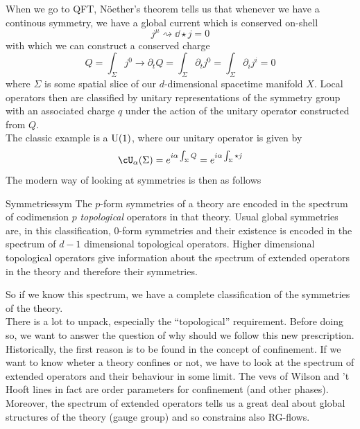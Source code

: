 When we go to QFT, Nöether's theorem tells us that whenever we have a continous symmetry, we have a global current which is conserved on-shell
\begin{equation}
	j^{\mu}\rightsquigarrow\dd\star j=0
\end{equation}
with which we can construct a conserved charge
\begin{equation}
	Q=\int_{\Sigma}j^{0}\rightarrow \partial_{t}Q=\int_{\Sigma}\partial_{t}j^{0}=\int_{\Sigma}\partial_{i}j^{i}=0
\end{equation}
where $\Sigma$ is some spatial slice of our $d$-dimensional spacetime manifold $X$. Local operators then are classified by unitary representations of the symmetry group with an associated charge $q$ under the action of the unitary operator constructed from $Q$.\\
The classic example is a $\mathrm{U}(1)$, where our unitary operator is given by
\begin{equation}
	\cU_{\alpha}(\Sigma)=e^{i\alpha\int_{\Sigma}Q}=e^{i\alpha\int_{\Sigma}\star j}
\end{equation}
The modern way of looking at symmetries is then as follows
\begin{defn}{Symmetries}{sym}
	The $p$-form symmetries of a theory are encoded in the spectrum of codimension $p$ \textit{topological} operators in that theory. Usual global symmetries are, in this classification, $0$-form symmetries and their existence is encoded in the spectrum of $d-1$ dimensional topological operators. Higher dimensional topological operators give information about the spectrum of extended operators in the theory and therefore their symmetries.
\end{defn}
So if we know this spectrum, we have a complete classification of the symmetries of the theory.\\
There is a lot to unpack, especially the ``topological'' requirement. Before doing so, we want to answer the question of why should we follow this new prescription. Historically, the first reason is to be found in the concept of confinement. If we want to know wheter a theory confines or not, we have to look at the spectrum of extended operators and their behaviour in some limit. The vevs of Wilson and 't Hooft lines in fact are order parameters for confinement (and other phases).\\
Moreover, the spectrum of extended operators tells us a great deal about global structures of the theory (gauge group) and so constrains also RG-flows.

